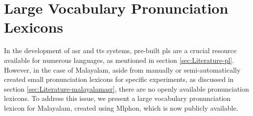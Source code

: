 
\section{Large Vocabulary Pronunciation Lexicons}
\label{sec:lvcsr-pronunciationdictionary}

In the development of  \gls{asr} and \gls{tts} systems, pre-built \gls{pl}s are a crucial resource available for numerous languages, as mentioned in section \ref{sec:Literature-pl}. However, in the case of Malayalam, aside from manually or semi-automatically created small pronunciation lexicons for specific experiments, as discussed in section \ref{sec:Literature-malayalamasr}, there are no openly available pronunciation lexicons. To address this issue, we present a large vocabulary pronunciation lexicon for Malayalam, created using Mlphon, which is now publicly available.

